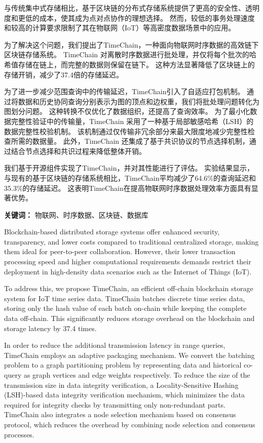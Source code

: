\cleardoublepage
{}
与传统集中式存储相比，基于区块链的分布式存储系统提供了更高的安全性、透明度和更低的成本，使其成为点对点协作的理想选择。
然而，较低的事务处理速度和较高的计算要求限制了其在物联网（IoT）等高密度数据场景中的应用。

为了解决这个问题，我们提出了TimeChain，一种面向物联网时序数据的高效链下区块链存储系统。
TimeChain 对离散时序数据进行批处理，并仅将每个批次的哈希值存储在链上，而完整的数据则保留在链下。
这种方法显著降低了区块链上的存储开销，减少了37.4倍的存储延迟。

为了进一步减少范围查询中的传输延迟，TimeChain引入了自适应打包机制。
通过将数据和历史协同查询分别表示为图的顶点和边权重，我们将批处理问题转化为图划分问题。
这种转换不仅优化了数据组织，还提高了查询效率。
为了最小化数据完整性验证中的传输量，TimeChain 采用了一种基于局部敏感哈希（LSH）的数据完整性校验机制。
该机制通过仅传输非冗余部分来最大限度地减少完整性检查所需的数据量。
此外，TimeChain 还集成了基于共识协议的节点选择机制，通过结合节点选择和共识过程来降低整体开销。

我们基于开源组件实现了TimeChain，并对其性能进行了评估。
实验结果显示，与现有的基于区块链的存储系统相比，TimeChain平均减少了64.6\%的查询延迟和35.3\%的存储延迟。
这表明TimeChain在提高物联网时序数据处理效率方面具有显著优势。

{\noindent \textbf{关键词：} 物联网、时序数据、区块链、数据库}

\cleardoublepage
{}
Blockchain-based distributed storage systems offer enhanced security, transparency, and lower costs compared to traditional centralized storage, making them ideal for peer-to-peer collaboration. 
However, their lower transaction processing speed and higher computational requirements demands restrict their deployment in high-density data scenarios such as the Internet of Things (IoT).

To address this, we propose TimeChain, an efficient off-chain blockchain storage system for IoT time series data.
TimeChain batches discrete time series data, storing only the hash value of each batch on-chain while keeping the complete data off-chain. 
This significantly reduces storage overhead on the blockchain and storage latency by 37.4 times. 

In order to reduce the additional transmission latency in range queries, TimeChain employs an adaptive packaging mechanism. 
We convert the batching problem to a graph partitioning problem by representing data and historical co-query as graph vertices and edge weights respectively.
To reduce the size of the transmission size in data integrity verification, a Locality-Sensitive Hashing (LSH)-based data integrity verification mechanism, which minimizes the data required for integrity checks by transmitting only non-redundant parts. 
TimeChain also integrates a node selection mechanism based on consensus protocol, which reduces the overhead by combining node selection and consensus processes.

